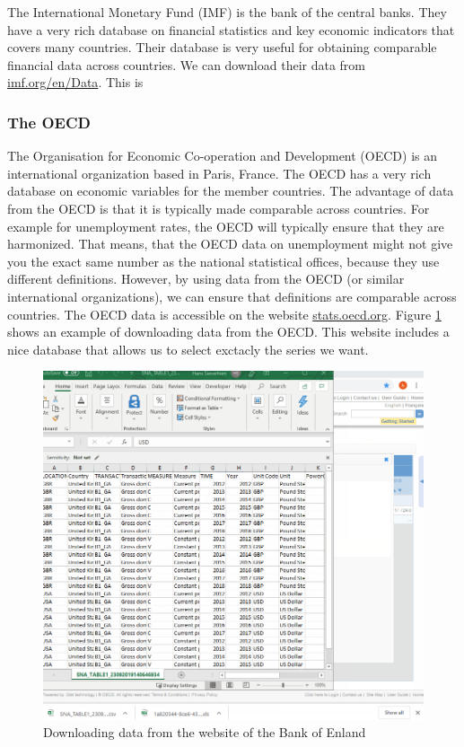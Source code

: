 \documentclass[]{book}
\begin{document}
The International Monetary Fund (IMF) is the bank of the central banks. They have a very rich database on financial statistics and key economic indicators that covers many countries. Their database is very useful for obtaining comparable financial data across countries. We can download their data from \href{https://www.imf.org/en/Data}{imf.org/en/Data}. This is

\hypertarget{the-oecd}{%
\subsubsection{The OECD}\label{the-oecd}}

The Organisation for Economic Co-operation and Development (OECD) is an international organization based in Paris, France. The OECD has a very rich database on economic variables for the member countries. The advantage of data from the OECD is that it is typically made comparable across countries. For example for unemployment rates, the OECD will typically ensure that they are harmonized. That means, that the OECD data on unemployment might not give you the exact same number as the national statistical offices, because they use different definitions. However, by using data from the OECD (or similar international organizations), we can ensure that definitions are comparable across countries.
The OECD data is accessible on the website \href{https://stats.oecd.org}{stats.oecd.org}. Figure \ref{fig:source5} shows an example of downloading data from the OECD. This website includes a nice database that allows us to select exctacly the series we want.

\begin{figure}

{\centering \includegraphics[width=0.6\linewidth]{_resources/chapter_sources/oecd} 

}

\caption{Downloading data from the website of the Bank of Enland}\label{fig:source5}
\end{figure}
\end{document}
